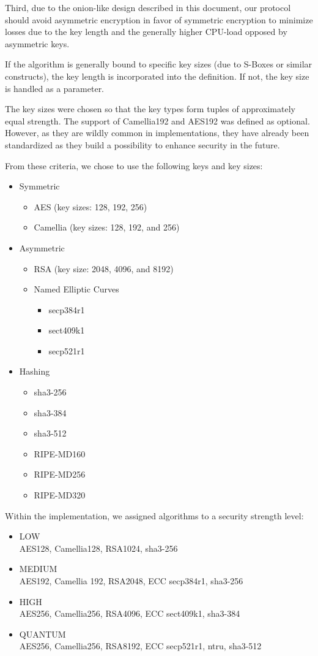 Third, due to the onion-like design described in this document, our protocol should avoid asymmetric encryption in favor of symmetric encryption to minimize losses due to the key length and the generally higher CPU-load opposed by asymmetric keys.

If the algorithm is generally bound to specific key sizes (due to S-Boxes or similar constructs), the key length is incorporated into the definition. If not, the key size is handled as a parameter.

The key sizes were chosen so that the key types form tuples of approximately equal strength. The support of Camellia192 and AES192 was defined as optional. However, as they are wildly common in implementations, they have already been standardized as they build a possibility to enhance security in the future.

From these criteria, we chose to use the following keys and key sizes:
\begin{itemize}
	\item Symmetric
	\begin{itemize}
		\item AES (key sizes: 128, 192, 256)
		\item Camellia (key sizes: 128, 192, and 256)
	\end{itemize}
	\item Asymmetric
	\begin{itemize}
		\item RSA (key size: 2048, 4096, and 8192)
		\item Named Elliptic Curves
		\begin{itemize}
			\item secp384r1
			\item sect409k1
			\item secp521r1
		\end{itemize}
	\end{itemize}
	\item Hashing
	\begin{itemize}
		\item sha3-256
		\item sha3-384
		\item sha3-512
		\item RIPE-MD160
		\item RIPE-MD256
		\item RIPE-MD320
	\end{itemize}
\end{itemize}

Within the implementation, we assigned algorithms to a security strength level:
\begin{itemize}
	\item LOW\\
	AES128, Camellia128, RSA1024, sha3-256
	\item MEDIUM\\
	AES192, Camellia 192, RSA2048, ECC secp384r1, sha3-256
	\item HIGH\\
	AES256, Camellia256, RSA4096, ECC sect409k1, sha3-384
	\item QUANTUM\\
	AES256, Camellia256, RSA8192, ECC secp521r1, ntru, sha3-512
\end{itemize}

